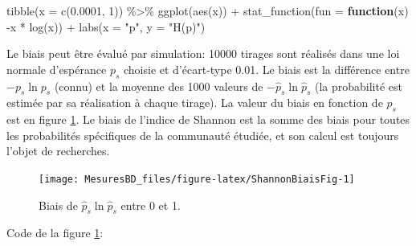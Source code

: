 \documentclass[
  11pt,
  american,
  a4paper,
  extrafontsizes,onecolumn,openright
  ]{memoir}
\newenvironment{Shaded}{\begin{snugshade}}{\end{snugshade}}
\newcommand{\AttributeTok}[1]{\textcolor[rgb]{0.77,0.63,0.00}{#1}}
\newcommand{\ControlFlowTok}[1]{\textcolor[rgb]{0.13,0.29,0.53}{\textbf{#1}}}
\newcommand{\DecValTok}[1]{\textcolor[rgb]{0.00,0.00,0.81}{#1}}
\newcommand{\FloatTok}[1]{\textcolor[rgb]{0.00,0.00,0.81}{#1}}
\newcommand{\FunctionTok}[1]{\textcolor[rgb]{0.00,0.00,0.00}{#1}}
\newcommand{\NormalTok}[1]{#1}
\newcommand{\SpecialCharTok}[1]{\textcolor[rgb]{0.00,0.00,0.00}{#1}}
\newcommand{\StringTok}[1]{\textcolor[rgb]{0.31,0.60,0.02}{#1}}
\begin{document}
\scriptsize

\begin{Shaded}
\begin{Highlighting}[]
\FunctionTok{tibble}\NormalTok{(}\AttributeTok{x =} \FunctionTok{c}\NormalTok{(}\FloatTok{0.0001}\NormalTok{, }\DecValTok{1}\NormalTok{)) }\SpecialCharTok{\%\textgreater{}\%} 
  \FunctionTok{ggplot}\NormalTok{(}\FunctionTok{aes}\NormalTok{(x)) }\SpecialCharTok{+} 
    \FunctionTok{stat\_function}\NormalTok{(}\AttributeTok{fun =} \ControlFlowTok{function}\NormalTok{(x) }\SpecialCharTok{{-}}\NormalTok{x }\SpecialCharTok{*} \FunctionTok{log}\NormalTok{(x)) }\SpecialCharTok{+}
    \FunctionTok{labs}\NormalTok{(}\AttributeTok{x =} \StringTok{"p"}\NormalTok{, }\AttributeTok{y =} \StringTok{"H(p)"}\NormalTok{)}
\end{Highlighting}
\end{Shaded}

\normalsize

Le biais peut être évalué par simulation: 10000 tirages sont réalisés dans une loi normale d'espérance \(p_s\) choisie et d'écart-type 0.01.
Le biais est la différence entre \(-p_s \ln{p_s}\) (connu) et la moyenne des 1000 valeurs de \(-\hat{p}_s \ln{\hat{p}}_s\) (la probabilité est estimée par sa réalisation à chaque tirage).
La valeur du biais en fonction de \(p_s\) est en figure \ref{fig:ShannonBiaisFig}.
Le biais de l'indice de Shannon est la somme des biais pour toutes les probabilités spécifiques de la communauté étudiée, et son calcul est toujours l'objet de recherches.



\scriptsize

\begin{figure}

{\centering \texttt{[image: MesuresBD\_files/figure-latex/ShannonBiaisFig-1]} 

}

\caption{Biais de \(\hat{p}_s \ln\hat{p}_s\) entre 0 et 1.}\label{fig:ShannonBiaisFig}
\end{figure}

\normalsize

Code de la figure \ref{fig:ShannonBiaisFig}:

\scriptsize
\end{document}
